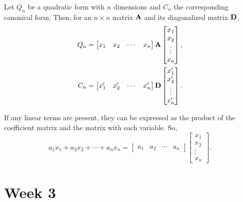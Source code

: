 \documentclass[12pt]{scrartcl}
\begin{document}
\begin{theorem}
Let $Q_n$ be a quadratic form with $n$ dimensions and $C_n$ the corresponding canonical form. Then, for an $n \times n$ matrix $\bold{A}$ and its diagonalized matrix $\bold{D}$,
    \begin{align*}
        Q_n &= \begin{bmatrix} x_1 & x_2 & \cdots & x_n \end{bmatrix} \bold{A} \begin{bmatrix} x_1 \\ x_2 \\ \vdots \\ x_n\end{bmatrix}, \\
    C_n &= \begin{bmatrix} x_1' & x_2' & \cdots & x_n' \end{bmatrix} \bold{D} \begin{bmatrix} x_1' \\ x_2' \\ \vdots \\ x_n'\end{bmatrix}.
    \end{align*}
\end{theorem}
If any linear terms are present, they can be expressed as the product of the coefficient matrix and the 
matrix with each variable. So, $$a_1x_1+a_2x_2+\cdots+a_nx_n = \begin{bmatrix}a_1 & a_2 & \cdots & a_n \end{bmatrix}
\begin{bmatrix} x_1 \\ x_2 \\ \vdots \\ x_n \end{bmatrix}.$$

\begin{exercise}

\end{exercise}
\newpage
\section{Week 3}
\end{document}

